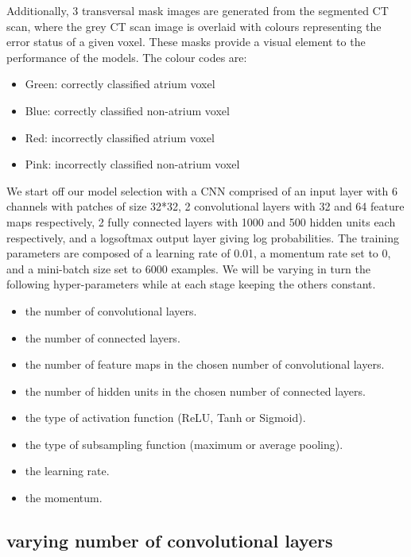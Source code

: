Additionally, 3 transversal mask images are generated from the segmented CT scan, where the grey CT scan image is overlaid with colours representing the error status of a given voxel. These masks provide a visual element to the performance of the models. The colour codes are:

\begin{itemize}
	\item Green: correctly classified atrium voxel
	\item Blue: correctly classified non-atrium voxel
	\item Red: incorrectly classified atrium voxel
	\item Pink: incorrectly classified non-atrium voxel
\end{itemize}

\noindent We start off our model selection with a CNN comprised of an input layer with 6 channels with patches of size 32*32, 2 convolutional layers with 32 and 64 feature maps respectively, 2 fully connected layers with 1000 and 500 hidden units each respectively, and a logsoftmax output layer giving log probabilities. The training parameters are composed of a learning rate of 0.01, a momentum rate set to 0, and a mini-batch size set to 6000 examples. We will be varying in turn the following hyper-parameters while at each stage keeping the others constant.\\

\begin{itemize}
	\item the number of convolutional layers.
	\item the number of connected layers.
	\item the number of feature maps in the chosen number of convolutional layers.
	\item the number of hidden units in the chosen number of connected layers.
	\item the type of activation function (ReLU, Tanh or Sigmoid).
	\item the type of subsampling function (maximum or average pooling).
	\item the learning rate.
	\item the momentum.
\end{itemize}

\subsection{varying number of convolutional layers}

